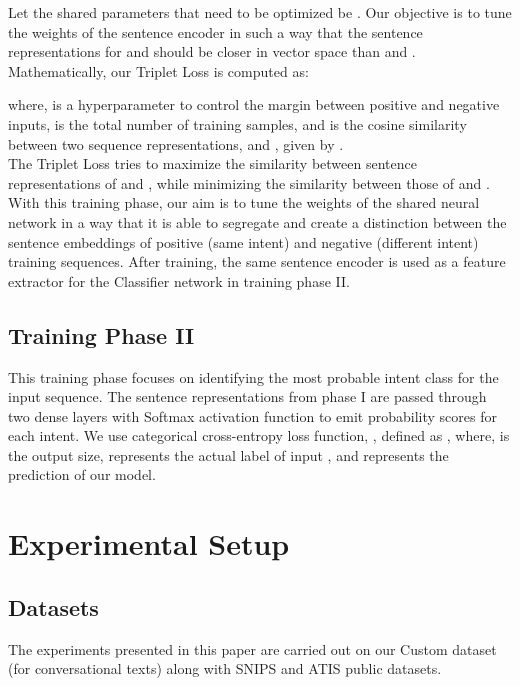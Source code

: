 \documentclass[conference]{IEEEtran}
\begin{document}
Let the shared parameters that need to be optimized be . Our objective is to tune the weights of the sentence encoder in such a way that the sentence representations for  and  should be closer in vector space than  and . Mathematically, our Triplet Loss is computed as:


where,  is a hyperparameter to control the margin between positive and negative inputs,  is the total number of training samples, and  is the cosine similarity between two sequence representations,  and  , given by .\\


The Triplet Loss tries to maximize the similarity between sentence representations of  and , while minimizing the similarity between those of  and . With this training phase, our aim is to tune the weights of the shared neural network in a way that it is able to segregate and create a distinction between the sentence embeddings of positive (same intent) and negative (different intent) training sequences. After training, the same sentence encoder is used as a feature extractor for the Classifier network in training phase II.

\subsection{Training Phase II}\label{sec:trainingPhaseII}

This training phase focuses on identifying the most probable intent class for the input sequence. The sentence representations from phase I are passed through two dense layers with Softmax activation function to emit probability scores for each intent. We use categorical cross-entropy loss function, , defined as , where,  is the output size,  represents the actual label of input , and  represents the prediction of our model.


\section{Experimental Setup}\label{sec:experimentalSetup}


\subsection{Datasets}\label{sec:datasets}

The experiments presented in this paper are carried out on our Custom dataset (for conversational texts) along with SNIPS \cite{coucke2018snips} and ATIS \cite{price-1990-evaluation} public datasets.
\end{document}
